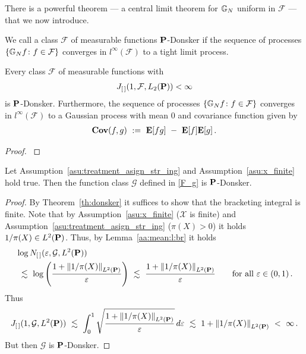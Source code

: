There is a powerful theorem --- a central limit theorem for $\G_N$ uniform in $\mathcal{F}$ --- that we now introduce.
\begin{definition}
  We call a class 
  $\mathcal{F}$ of measurable functions 
$\P$-Donsker
if the sequence of processes 
$\left\{ \G_N f \colon f\in\mathcal{F}\right\}$
converges in
$l^\infty(\mathcal{F})$
to a tight limit process.
\end{definition}

\begin{theorem}
  \label{th:donsker}
  Every class $\mathcal{F}$ of measurable functions 
  with
  \begin{gather*}
    J
    _{[\,]}
    (
    1
    ,
    \mathcal{F}
    ,
    L_2(\P)
    )
    <\infty
  \end{gather*}
  is
  $\P$-Donsker.
  Furthermore,
  the sequence of processes 
$\left\{ \G_N f \colon f\in\mathcal{F}\right\}$
  converges 
  in
$l^\infty(\mathcal{F})$
to a Gaussian process with mean 0 and covariance function given by
\begin{gather*}
  \mathbf{Cov}(f,g)
  \ 
  :=
  \ 
  \E[fg]
  \ 
  -
  \ 
  \E[f]\E[g]
  \,.
\end{gather*}
\end{theorem}
\begin{proof}
  \cite[Theorem~19.5]{Vaart2000}
\end{proof}
\begin{lemma}
  \label{lem:G_P_donsker}
  Let Assumption~\eqref{asu:treatment_asign_str_ing} and Assumption~\ref{asu:x_finite} hold true.
Then the function class $\mathcal{G}$ defined in \eqref{F_g} is $\P$-Donsker. 
\end{lemma}
\begin{proof}
  By Theorem~\ref{th:donsker} it suffices to show that the bracketing integral is finite.
Note that by Assumption~\ref{asu:x_finite} ($\mathcal{X}$ is finite) and Assumption~\eqref{asu:treatment_asign_str_ing} ($\pi(X)>0$) it holds $1/\pi(X)\in L^2(\P)$.
  Thus,
  by Lemma~\ref{aa:mean:l:br}
  it holds
  \begin{align*}
    &
  \log
  N_{[\,]}
    (
    \varepsilon
    ,
    \mathcal{G}, L^2(\P))
    \\
    &
    \ 
    \lesssim
    \ 
    \log
    \left(
      \frac
      {
      1+
    \norm{1/\pi(X)}_{ L^2(\P)}
      }
      {\varepsilon}
    \right)
    \ 
    \lesssim
    \ 
      \frac
      {
      1+
    \norm{1/\pi(X)}_{ L^2(\P)}
      }
      {\varepsilon}
    \qquad
    \text{for all}
    \ 
    \varepsilon\in (0,1)
    \,.
  \end{align*}
  Thus
  \begin{gather*}
    J_{[\,]}(1,\mathcal{G},L^2(\P))
    \ 
    \lesssim
    \ 
    \int_0^1
    \sqrt
    {
      \frac
      {
      1+
    \norm{1/\pi(X)}_{ L^2(\P)}
      }
      {\varepsilon}
    }
    \,
    d\varepsilon
    \ 
    \lesssim
    \ 
      1+
    \norm{1/\pi(X)}_{ L^2(\P)}
    \ 
    <
    \ 
    \infty
    \,.
  \end{gather*}
But then $\mathcal{G}$ is $\P$-Donsker.

\end{proof}
